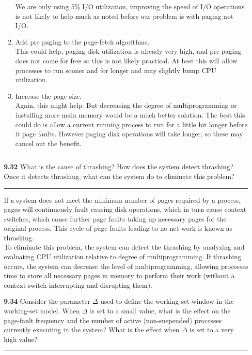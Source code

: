 \documentclass[12pt]{jhwhw}
\begin{document}
\begin{enumerate}
			We are only using 5\% I/O utilization, improving the speed of I/O operations is
			not likely to help much as noted before our problem is with paging not I/O.
		\item Add pre paging to the page-fetch algorithms. \\
			This could help, paging disk utilization is already very high, and pre paging
			does not come for free so this is not likely practical. At best this will allow
			processes to run sooner and for longer and may slightly bump CPU utilization.
		\item Increase the page size. \\
			Again, this might help. But decreasing the degree of multiprogramming or installing
			more main memory would be a much better solution. The best this could do is allow
			a current running process to run for a little bit longer before it page faults.
			However paging disk operations will take longer, so these may cancel out the benefit.
	\end{enumerate}
\textcolor[RGB]{240,240,240}{\rule{\textwidth}{0.5pt}}\bigbreak

\textbf{9.32}  
	What is the cause of thrashing? How does the system detect thrashing? Once it detects 
	thrashing, what can the system do to eliminate this problem?
\textcolor[RGB]{240,240,240}{\rule{\textwidth}{0.5pt}}\bigbreak

	\begin{addmargin}[1em]{}
		If a system does not meet the minimum number of pages required by a process, pages will
		continuously fault causing disk operations, which in turn cause context switches, which cause
		further page faults taking up necessary pages for the original process. This cycle of page faults
		leading to no net work is known as thrashing. \\
		To eliminate this problem, the system can detect the thrashing by analyzing and evaluating
		CPU utilization relative to degree of multiprogramming. If thrashing occurs, the system
		can decrease the level of multiprogramming, allowing processes time to store all necessary
		pages in memory to perform their work (without a context switch interrupting and disrupting them).
	\end{addmargin}

\bigbreak
\textbf{9.34}  
	Consider the parameter $\Delta$ used to define the working-set window in the working-set model.
	When $\Delta$ is set to a small value, what is the effect on the page-fault frequency and the number
	of active (non-suspended) processes currently executing in the system? What is the effect when $\Delta$
	is set to a very high value?
\textcolor[RGB]{240,240,240}{\rule{\textwidth}{0.5pt}}\bigbreak
\end{document}
